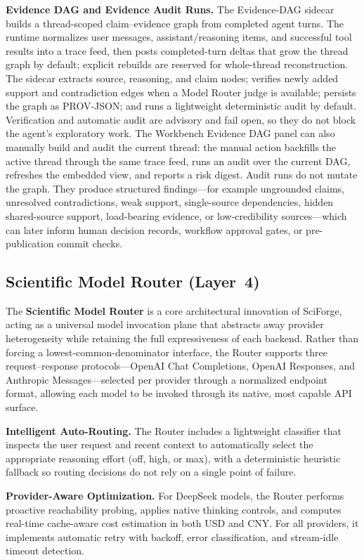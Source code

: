 \documentclass[sn-basic,Numbered,pdflatex]{sn-jnl}
\begin{document}
\textbf{Evidence DAG and Evidence Audit Runs.} The Evidence-DAG sidecar builds a thread-scoped claim--evidence graph from completed agent turns. The runtime normalizes user messages, assistant/reasoning items, and successful tool results into a trace feed, then posts completed-turn deltas that grow the thread graph by default; explicit rebuilds are reserved for whole-thread reconstruction. The sidecar extracts source, reasoning, and claim nodes; verifies newly added support and contradiction edges when a Model Router judge is available; persists the graph as PROV-JSON; and runs a lightweight deterministic audit by default. Verification and automatic audit are advisory and fail open, so they do not block the agent's exploratory work. The Workbench Evidence DAG panel can also manually build and audit the current thread: the manual action backfills the active thread through the same trace feed, runs an audit over the current DAG, refreshes the embedded view, and reports a risk digest. Audit runs do not mutate the graph. They produce structured findings---for example ungrounded claims, unresolved contradictions, weak support, single-source dependencies, hidden shared-source support, load-bearing evidence, or low-credibility sources---which can later inform human decision records, workflow approval gates, or pre-publication commit checks.

\subsection{Scientific Model Router (Layer~4)}
The \textbf{Scientific Model Router} is a core architectural innovation of SciForge, acting as a universal model invocation plane that abstracts away provider heterogeneity while retaining the full expressiveness of each backend. Rather than forcing a lowest-common-denominator interface, the Router supports three request--response protocols---OpenAI Chat Completions, OpenAI Responses, and Anthropic Messages---selected per provider through a normalized endpoint format, allowing each model to be invoked through its native, most capable API surface.

\textbf{Intelligent Auto-Routing.} The Router includes a lightweight classifier that inspects the user request and recent context to automatically select the appropriate reasoning effort (off, high, or max), with a deterministic heuristic fallback so routing decisions do not rely on a single point of failure.

\textbf{Provider-Aware Optimization.} For DeepSeek models, the Router performs proactive reachability probing, applies native thinking controls, and computes real-time cache-aware cost estimation in both USD and CNY. For all providers, it implements automatic retry with backoff, error classification, and stream-idle timeout detection.
\end{document}
